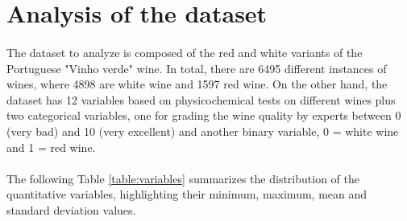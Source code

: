 \documentclass[10pt]{article}
\begin{document}




\tableofcontents

\newpage
{}

\section{Analysis of the dataset}

\paragraph*{}
The dataset to analyze is composed of the red and white variants of the Portuguese "Vinho verde" wine. In total, there are 6495 different instances of wines, where 4898 are white wine and 1597 red wine. On the other hand, the dataset has 12 variables based on physicochemical tests on different wines plus two categorical variables, one for grading the wine quality by experts between 0 (very bad) and 10 (very excellent) and another binary variable, 0 = white wine and 1 = red wine.

\paragraph*{}
The following Table \ref{table:variables} summarizes the distribution of the quantitative variables, highlighting their minimum, maximum, mean and standard deviation values.
\end{document}
